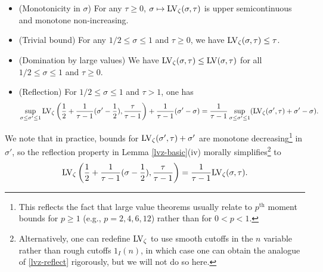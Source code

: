 \begin{lemma}\label{lvz-basic}
    \begin{itemize}
        \item[(i)] (Monotonicity in $\sigma$) For any $\tau \geq 0$, $\sigma \mapsto \mathrm{LV}_\zeta(\sigma,\tau)$ is upper semicontinuous and monotone non-increasing.
        \item[(ii)] (Trivial bound) For any $1/2 \leq \sigma \leq 1$ and $\tau \geq 0$, we have $\mathrm{LV}_\zeta(\sigma,\tau) \leq \tau$.
        \item[(iii)] (Domination by large values)  We have $\mathrm{LV}_\zeta(\sigma,\tau) \leq \mathrm{LV}(\sigma,\tau)$ for all $1/2 \leq \sigma \leq 1$ and $\tau \geq 0$.
        \item[(iv)] (Reflection) For $1/2 \leq \sigma \leq 1$ and $\tau > 1$, one has
              $$ \sup_{\sigma \leq \sigma' \leq 1} \mathrm{LV}_\zeta\left(\frac{1}{2} + \frac{1}{\tau-1} (\sigma'-\frac{1}{2}), \frac{\tau}{\tau-1}\right) + \frac{1}{\tau-1} (\sigma'-\sigma) = \frac{1}{\tau-1} \sup_{\sigma \leq \sigma' \leq 1} (\mathrm{LV}_\zeta(\sigma',\tau) + \sigma'-\sigma).$$
    \end{itemize}
\end{lemma}


We note that in practice, bounds for $\mathrm{LV}_\zeta(\sigma',\tau)+\sigma'$ are monotone decreasing\footnote{This reflects the fact that large value theorems usually relate to $p^{\mathrm{th}}$ moment bounds for $p \geq 1$ (e.g., $p = 2, 4, 6, 12$) rather than for $0 < p < 1$.} in $\sigma'$, so the reflection property in Lemma \ref{lvz-basic}(iv) morally simplifies\footnote{Alternatively, one can redefine $\mathrm{LV}_\zeta$ to use smooth cutoffs in the $n$ variable rather than rough cutoffs $1_I(n)$, in which case one can obtain the analogue of \eqref{lvz-reflect} rigorously, but we will not do so here.} to
\begin{equation}\label{lvz-reflect}
    \mathrm{LV}_\zeta\left(\frac{1}{2} + \frac{1}{\tau-1} (\sigma-\frac{1}{2}), \frac{\tau}{\tau-1}\right) = \frac{1}{\tau-1} \mathrm{LV}_\zeta(\sigma,\tau).
\end{equation}


